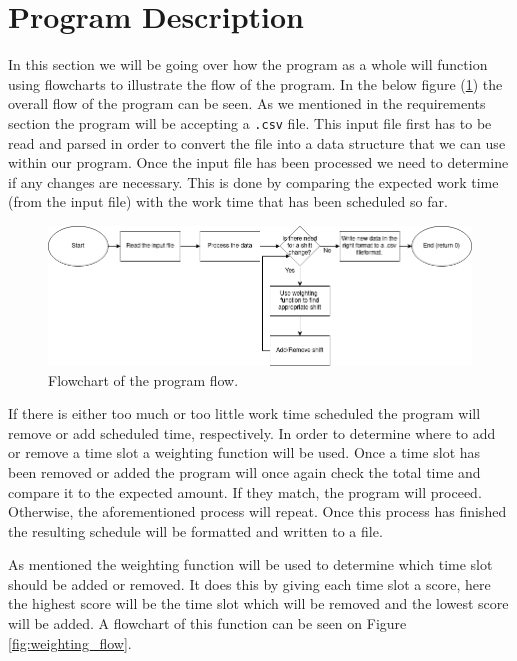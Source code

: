 \section{Program Description}
In this section we will be going over how the program as a whole will function using flowcharts to illustrate the flow of the program. In the below figure (\ref{fig:Main_Flowchart}) the overall flow of the program can be seen. As we mentioned in the requirements section the program will be accepting a \verb|.csv| file. This input file first has to be read and parsed in order to convert the file into a data structure that we can use within our program. Once the input file has been processed we need to determine if any changes are necessary. This is done by comparing the expected work time (from the input file) with the work time that has been scheduled so far.

\begin{figure}[ht!]
    \centering
    \includegraphics[width=\textwidth]{media/Flowcharts/General Flowchart.png}
    \caption{Flowchart of the program flow.}
    \label{fig:Main_Flowchart}
\end{figure}

If there is either too much or too little work time scheduled the program will remove or add scheduled time, respectively. In order to determine where to add or remove a time slot a weighting function will be used. Once a time slot has been removed or added the program will once again check the total time and compare it to the expected amount. If they match, the program will proceed. Otherwise, the aforementioned process will repeat. Once this process has finished the resulting schedule will be formatted and written to a file.

As mentioned the weighting function will be used to determine which time slot should be added or removed. It does this by giving each time slot a score, here the highest score will be the time slot which will be removed and the lowest score will be added. A flowchart of this function can be seen on Figure \ref{fig:weighting_flow}.


